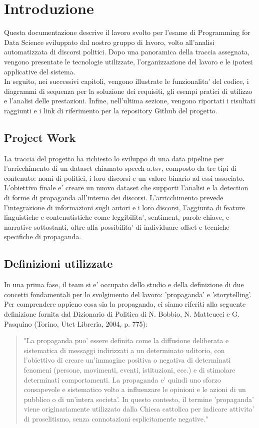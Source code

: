 \documentclass{article}
\begin{document}
	\tableofcontents

\newpage

	\section{Introduzione}
Questa documentazione descrive il lavoro svolto per l'esame di Programming for Data Science sviluppato dal nostro gruppo di lavoro, volto all'analisi automatizzata di discorsi politici. Dopo una panoramica della traccia assegnata, vengono presentate le tecnologie utilizzate, l'organizzazione del lavoro e le ipotesi applicative del sistema.\\
In seguito, nei successivi capitoli, vengono illustrate le funzionalita' del codice, i diagrammi di sequenza per la soluzione dei requisiti, gli esempi pratici di utilizzo e l'analisi delle prestazioni. Infine, nell'ultima sezione, vengono riportati i risultati raggiunti e i link di riferimento per la repository Github del progetto.

	\subsection{Project Work}
La traccia del progetto ha richiesto lo sviluppo di una data pipeline per l'arricchimento di un dataset chiamato speech-a.tsv, composto da tre tipi di contenuto: nomi di politici, i loro discorsi e un valore binario ad essi associato. \\ L'obiettivo finale e' creare un nuovo dataset che supporti l'analisi e la detection di forme di propaganda all'interno dei discorsi. L'arricchimento prevede l'integrazione di informazioni sugli autori e i loro discorsi, l'aggiunta di feature linguistiche e contenutistiche come leggibilita', sentiment, parole chiave, e narrative sottostanti, oltre alla possibilita' di individuare offset e tecniche specifiche di propaganda.

	\subsection{Definizioni utilizzate}
In una prima fase, il team si e' occupato dello studio e della definizione di due concetti fondamentali per lo svolgimento del lavoro: 'propaganda' e 'storytelling'. Per comprendere appieno cosa sia la propaganda, ci siamo riferiti alla seguente definizione fornita dal Dizionario di Politica di N. Bobbio, N. Matteucci e G. Pasquino (Torino, Utet Libreria, 2004, p. 775):

	\begin{quote}"La propaganda puo' essere definita come la diffusione deliberata e sistematica di messaggi indirizzati a un determinato uditorio, con l'obiettivo di creare un'immagine positiva o negativa di determinati fenomeni (persone, movimenti, eventi, istituzioni, ecc.) e di stimolare determinati comportamenti. La propaganda e' quindi uno sforzo consapevole e sistematico volto a influenzare le opinioni e le azioni di un pubblico o di un'intera societa'. In questo contesto, il termine 'propaganda' viene originariamente utilizzato dalla Chiesa cattolica per indicare attivita' di proselitismo, senza connotazioni esplicitamente negative." \end{quote}
	
\end{document}

